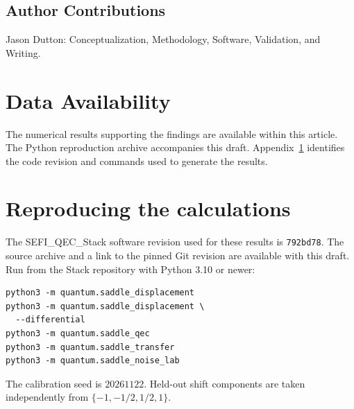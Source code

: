 \documentclass[aip,adv,reprint,floatfix]{revtex4-2}
\begin{document}
\subsection*{Author Contributions}
Jason Dutton: Conceptualization, Methodology, Software, Validation, and Writing.

\section*{Data Availability}
The numerical results supporting the findings are available within this article. The Python reproduction archive accompanies this draft. Appendix~\ref{app:repro} identifies the code revision and commands used to generate the results.

\appendix
\section{Reproducing the calculations}
\label{app:repro}

The SEFI\_QEC\_Stack software revision used for these results is
\texttt{792bd78}. The source archive and a link to the pinned Git revision are available with this draft. Run from the Stack repository with Python 3.10 or newer:
\begin{verbatim}
python3 -m quantum.saddle_displacement
python3 -m quantum.saddle_displacement \
  --differential
python3 -m quantum.saddle_qec
python3 -m quantum.saddle_transfer
python3 -m quantum.saddle_noise_lab
\end{verbatim}
The calibration seed is \(20261122\). Held-out shift components are taken independently from \(\{-1,-1/2,1/2,1\}\).


\end{document}
